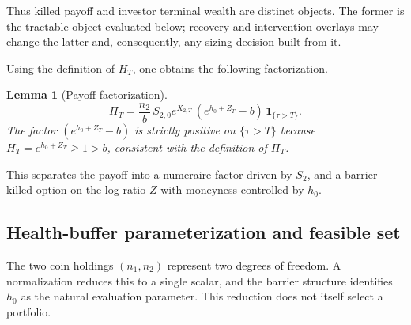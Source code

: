 \documentclass[11pt]{article}
\newcommand{\one}{\mathbf{1}}
\theoremstyle{plain}
\newtheorem{lemma}[theorem]{Lemma}
\theoremstyle{definition}
\theoremstyle{remark}
\begin{document}
Thus killed payoff and investor terminal wealth are distinct objects. The former is the
tractable object evaluated below; recovery and intervention overlays may change the latter
and, consequently, any sizing decision built from it.

Using the definition of $H_T$, one obtains the following factorization.

\begin{lemma}[Payoff factorization]\label{lem:payoff-factor}
\begin{equation}\label{eq:payoff-factor}
\Pi_T
=
\frac{n_2}{b}\,S_{2,0}e^{X_{2,T}}\,(e^{h_0+Z_T}-b)\,\one_{\{\tau>T\}}.
\end{equation}
The factor $(e^{h_0+Z_T}-b)$ is strictly positive on $\{\tau>T\}$ because $H_T=e^{h_0+Z_T}\ge 1>b$,
consistent with the definition of $\Pi_T$.
\end{lemma}
This separates the payoff into a numeraire factor driven by $S_2$, and a barrier-killed option on the
log-ratio $Z$ with moneyness controlled by $h_0$.

\subsection{Health-buffer parameterization and feasible set}\label{sec:1d}

The two coin holdings $(n_1,n_2)$ represent two degrees of freedom. A normalization reduces
this to a single scalar, and the barrier structure identifies $h_0$ as the natural evaluation
parameter. This reduction does not itself select a portfolio.
\end{document}
